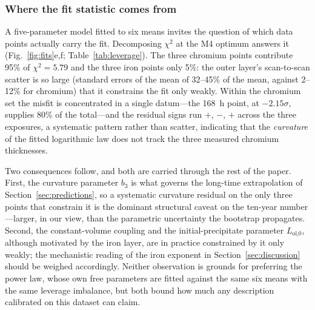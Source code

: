 \documentclass[preprint,12pt]{elsarticle}
\begin{document}
\subsubsection*{Where the fit statistic comes from}

A five-parameter model fitted to six means invites the question of which
data points actually carry the fit. Decomposing $\chi^2$ at the M4
optimum answers it (Fig.~\ref{fig:fits}e,f;
Table~\ref{tab:leverage}). The three chromium points contribute 95\% of
$\chi^2 = 5.79$ and the three iron points only 5\%: the outer layer's
scan-to-scan scatter is so large (standard errors of the mean of 32--45\%
of the mean, against 2--12\% for chromium) that it constrains the fit
only weakly. Within the chromium set the misfit is concentrated in a
single datum---the 168~h point, at $-2.15\sigma$, supplies 80\% of the
total---and the residual signs run $+$, $-$, $+$ across the three
exposures, a systematic pattern rather than scatter, indicating that the
\emph{curvature} of the fitted logarithmic law does not track the three
measured chromium thicknesses.

Two consequences follow, and both are carried through the rest of the
paper. First, the curvature parameter $b_3$ is what governs the long-time
extrapolation of Section~\ref{sec:predictions}, so a systematic curvature
residual on the only three points that constrain it is the dominant
structural caveat on the ten-year number---larger, in our view, than the
parametric uncertainty the bootstrap propagates. Second, the
constant-volume coupling and the initial-precipitate parameter
$L_\text{ol,0}$, although motivated by the iron layer, are in practice
constrained by it only weakly; the mechanistic reading of the iron
exponent in Section~\ref{sec:discussion} should be weighed accordingly.
Neither observation is grounds for preferring the power law, whose own
free parameters are fitted against the same six means with the same
leverage imbalance, but both bound how much any description calibrated on
this dataset can claim.
\end{document}
